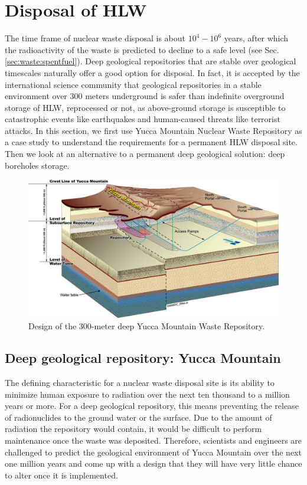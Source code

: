 \documentclass[nofootinbib,preprint,aps]{revtex4-1}
\begin{document}
\section{Disposal of HLW}
\label{sec:disposal}
    The time frame of nuclear waste disposal is about $10^4-10^6$ years, after which the radioactivity
    of the waste is predicted to decline to a safe level (see Sec.\ref{sec:waste:spentfuel}).
    Deep geological repositories that are stable over geological timescales naturally offer a good option for disposal.
    In fact, it is accepted by the international science community that geological repositories in a stable environment over 300 meters underground 
    is safer than indefinite overground storage of HLW, reprocessed or not, as above-ground storage
    is susceptible to catastrophic events like earthquakes and human-caused
    threats like terrorist attacks.\cite{fmr11}
    In this section, we first use Yucca Mountain Nuclear Waste
    Repository     as a case study to understand the requirements for a permanent HLW disposal site.
    Then we look at an alternative to a permanent deep geological solution:
    deep boreholes storage.
        \begin{figure}[h]
            \centering
            \includegraphics[width=\textwidth]{yuccaRepo.jpg}
            \caption{Design of the 300-meter deep Yucca Mountain Waste Repository.\cite{yucpic}}
            \label{fig:yucca}
        \end{figure}
    \subsection{Deep geological repository: Yucca Mountain}
        The defining characteristic for a nuclear waste disposal site is its ability to minimize human
        exposure to radiation over the next ten thousand to a million years or more.
        For a deep geological repository, this means preventing the release
        of radionuclides to the ground water or the surface.
        Due to the amount of radiation the repository would contain, it would be difficult to perform
        maintenance once the waste was deposited. Therefore, scientists and engineers are challenged
        to predict the geological environment of Yucca Mountain over the next one million years and come up
        with a design that they will have very little chance to alter once it is implemented.
\end{document}
